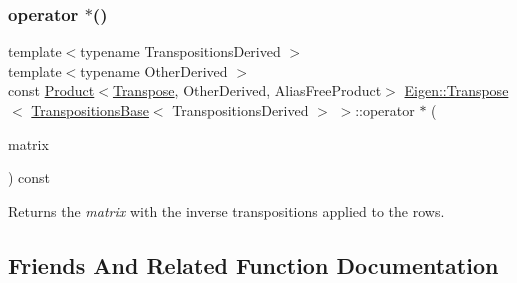 \subsubsection{\texorpdfstring{operator $\ast$()}{operator *()}}
{\footnotesize\ttfamily template$<$typename Transpositions\+Derived $>$ \\
template$<$typename Other\+Derived $>$ \\
const \mbox{\hyperlink{class_eigen_1_1_product}{Product}}$<$\mbox{\hyperlink{class_eigen_1_1_transpose}{Transpose}}, Other\+Derived, Alias\+Free\+Product$>$ \mbox{\hyperlink{class_eigen_1_1_transpose}{Eigen\+::\+Transpose}}$<$ \mbox{\hyperlink{class_eigen_1_1_transpositions_base}{Transpositions\+Base}}$<$ Transpositions\+Derived $>$ $>$\+::operator $\ast$ (\begin{DoxyParamCaption}\item[{const \mbox{\hyperlink{class_eigen_1_1_matrix_base}{Matrix\+Base}}$<$ Other\+Derived $>$ \&}]{matrix }\end{DoxyParamCaption}) const\hspace{0.3cm}{\ttfamily [inline]}}

\begin{DoxyReturn}{Returns}
the {\itshape matrix} with the inverse transpositions applied to the rows. 
\end{DoxyReturn}


\subsection{Friends And Related Function Documentation}
\mbox{\label{class_eigen_1_1_transpose_3_01_transpositions_base_3_01_transpositions_derived_01_4_01_4_abad977a8ed63d154defc69a8b49015f1}} 
